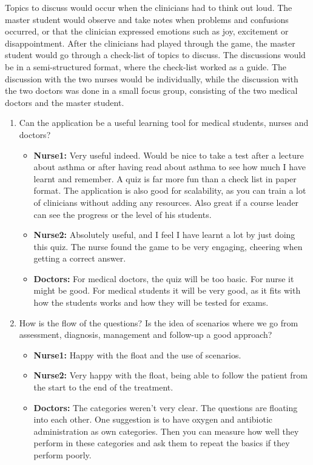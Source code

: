Topics to discuss would occur when the clinicians had to think out loud. The master student would observe and take notes when problems and confusions occurred, or that the clinician expressed emotions such as joy, excitement or disappointment. After the clinicians had played through the game, the master student would go through a check-list of topics to discuss. The discussions would be in a semi-structured format, where the check-list worked as a guide. The discussion with the two nurses would be individually, while  the discussion with the two doctors was done in a small focus group, consisting of the two medical doctors and the master student. 

\begin{enumerate}
	\item Can the application be a useful learning tool for medical students, nurses and doctors?
	\begin{itemize}
		\item \textbf{Nurse1:} Very useful indeed. Would be nice to take a test after a lecture about asthma or after having read about asthma to see how much I have learnt and remember. A quiz is far more fun than a check list in paper format. The application is also good for scalability, as you can train a lot of clinicians without adding any resources. Also great if a course leader can see the progress or the level of his students.
		\item \textbf{Nurse2:} Absolutely useful, and I feel I have learnt a lot by just doing this quiz. The nurse found the game to be very engaging, cheering when getting a correct answer. 
		\item \textbf{Doctors:} For medical doctors, the quiz will be too basic. For nurse it might be good. For medical students it will be very good, as it fits with how the students works and how they will be tested for exams.
	\end{itemize}
	\item How is the flow of the questions? Is the idea of scenarios where we go from assessment, diagnosis, management and follow-up a good approach?
	\begin{itemize}
		\item \textbf{Nurse1:} Happy with the float and the use of scenarios.
		\item \textbf{Nurse2:} Very happy with the float, being able to follow the patient from the start to the end of the treatment.
		\item \textbf{Doctors:} The categories weren't very clear. The questions are floating into each other. One suggestion is to have oxygen and antibiotic administration as own categories. Then you can measure how well they perform in these categories and ask them to repeat the basics if they perform poorly.

\end{itemize}
\end{enumerate}
